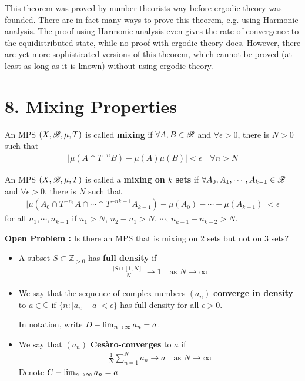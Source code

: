 \documentclass[12pt,a4paper]{report}
\begin{document}
This theorem was proved by number theorists way before ergodic theory was founded. There are in fact many ways to prove this theorem, e.g. using Harmonic analysis. The proof using Harmonic analysis even gives the rate of convergence to the equidistributed state, while no proof with ergodic theory does. However, there are yet more sophisticated versions of this theorem, which cannot be proved (at least as long as it is known) without using ergodic theory.
\s

\section*{8. Mixing Properties}

 An MPS $(X,\mathscr{B}, \mu,T)$ is called \textbf{mixing} if $\forall A,B\in \mathscr{B}$ and $\forall \epsilon>0$, there is $N>0$ such that
\begin{align*}
\Big| \mu(A\cap T^{-n}B) - \mu(A)\mu(B) \Big| < \epsilon \quad \forall n >N
\end{align*}
\s

 An MPS $(X,\mathscr{B}, \mu, T)$ is called a \textbf{mixing on $k$ sets} if $\forall A_0, A_1, \cdots,A_{k-1} \in \mathscr{B}$ and $\forall \epsilon >0$, there is $N$ such that
\begin{align*}
\Big| \mu(A_0 \cap T^{-n_1} A \cap \cdots \cap T^{-nk-1}A_{k-1}) - \mu(A_0) -\cdots -\mu(A_{k-1}) \Big| < \epsilon
\end{align*}
for all $n_1, \cdots, n_{k-1}$ if $n_1>N$, $n_2-n_1>N$, $\cdots$, $n_{k-1} - n_{k-2} >N$.
\s

\textbf{Open Problem :} Is there an MPS that is mixing on 2 sets but not on 3 sets?
\s

\begin{itemize}
\item A subset $S \subset \mathbb{Z}_{>0}$ has \textbf{full density} if
\begin{align*}
\frac{|S\cap [1,N]|}{N} \rightarrow 1 \quad \text{as } N\rightarrow \infty
\end{align*}
\item We say that the sequence of complex numbers $(a_n)$ \textbf{converge in density} to $a\in \mathbb{C}$ if $\{n: |a_n -a| <\epsilon \}$ has full density for all $\epsilon >0$.

In notation, write $D-\lim_{n\rightarrow \infty} a_n = a$.
\item We say that $(a_n)$ \textbf{Ces\`{a}ro-converges} to $a$ if
\begin{align*}
\frac{1}{N} \sum_{n=1}^N a_n \rightarrow a \quad \text{as } N\rightarrow \infty
\end{align*}
Denote $C-\lim_{n\rightarrow \infty} a_n= a$
\end{itemize}
\s
\end{document}
